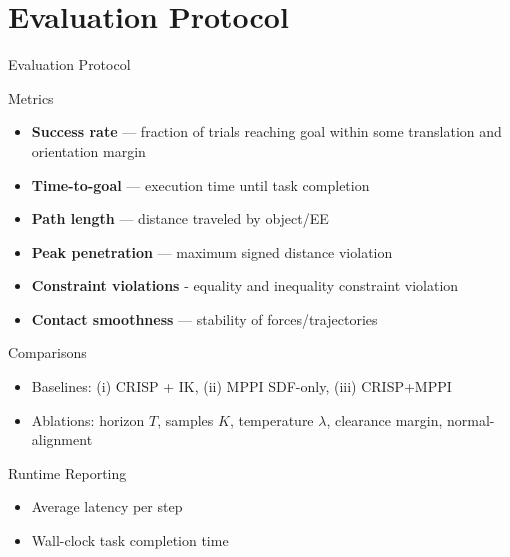 \documentclass[10pt, aspectratio=169]{beamer}
\begin{document}
\section{Evaluation Protocol}
\begin{frame}{Evaluation Protocol}
  \begin{block}{Metrics}
    \begin{itemize}
      \item \textbf{Success rate} — fraction of trials reaching goal within some translation and orientation margin
      \item \textbf{Time-to-goal} — execution time until task completion
      \item \textbf{Path length} — distance traveled by object/EE
      \item \textbf{Peak penetration} — maximum signed distance violation
      \item \textbf{Constraint violations} - equality and inequality constraint violation
      \item \textbf{Contact smoothness} — stability of forces/trajectories
    \end{itemize}
  \end{block}

  \begin{block}{Comparisons}
    \begin{itemize}
      \item Baselines: (i) CRISP + IK, (ii) MPPI SDF-only, (iii) CRISP+MPPI
      \item Ablations: horizon $T$, samples $K$, temperature $\lambda$,  
            clearance margin, normal-alignment
    \end{itemize}
  \end{block}

  \begin{block}{Runtime Reporting}
    \begin{itemize}
      \item Average latency per step
      \item Wall-clock task completion time
    \end{itemize}
  \end{block}
\end{frame}

\end{document}
